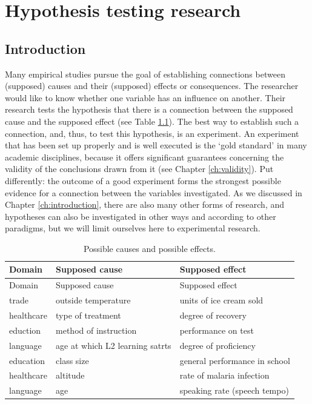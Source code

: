 \documentclass[
]{book}
\begin{document}
\hypertarget{ch:research}{%
\chapter{Hypothesis testing research}\label{ch:research}}

\hypertarget{introduction}{%
\section{Introduction}\label{introduction}}

Many empirical studies pursue the goal of establishing connections between (supposed) causes and their (supposed) effects or consequences. The researcher would like to know whether one variable has an influence on another. Their research tests the hypothesis that there is a connection between the supposed cause and the supposed effect (see Table \ref{tab:causeeffect}). The best way to establish such a connection, and, thus, to test this hypothesis, is an experiment. An experiment that has been set up properly and is well executed is the `gold standard' in many academic disciplines, because it offers significant guarantees concerning the validity of the conclusions drawn from it (see Chapter \ref{ch:validity}). Put differently: the outcome of a good experiment forms the strongest possible evidence for a connection between the variables investigated. As we discussed in Chapter \ref{ch:introduction}, there are also many other forms of research, and hypotheses can also be investigated in other ways and according to other paradigms, but we will limit ourselves here to experimental research.

\begin{longtable}[]{@{}lll@{}}
\caption{\label{tab:causeeffect} Possible causes and possible effects.}\tabularnewline
\toprule
Domain & Supposed cause & Supposed effect\tabularnewline
\midrule
\endfirsthead
\toprule
Domain & Supposed cause & Supposed effect\tabularnewline
\midrule
\endhead
trade & outside temperature & units of ice cream sold\tabularnewline
healthcare & type of treatment & degree of recovery\tabularnewline
eduction & method of instruction & performance on test\tabularnewline
language & age at which L2 learning satrts & degree of proficiency\tabularnewline
education & class size & general performance in school\tabularnewline
healthcare & altitude & rate of malaria infection\tabularnewline
language & age & speaking rate (speech tempo)\tabularnewline
\bottomrule
\end{longtable}
\end{document}

